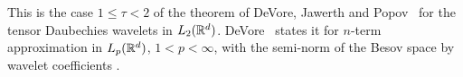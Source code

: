 This is the case $1 \leq \tau < 2$ of the theorem of DeVore, Jawerth and
Popov~\cite{DeVoreJawerthPopov} for the tensor Daubechies wavelets in $L_2(\mathbb{R}^d)$.
DeVore~\cite[\S 7.6, (7.41) and Remark~7.6]{DeVore1998} states it for $n$-term approximation in
$L_p(\mathbb{R}^d)$, $1 < p < \infty$, with the semi-norm of the Besov space by wavelet coefficients
\cite[(7.29)]{DeVore1998}.
